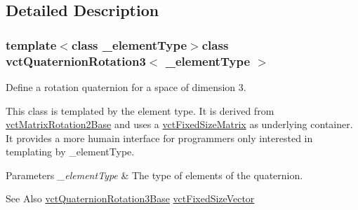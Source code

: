 \subsection{Detailed Description}
\subsubsection*{template$<$class \-\_\-element\-Type$>$class vct\-Quaternion\-Rotation3$<$ \-\_\-element\-Type $>$}

Define a rotation quaternion for a space of dimension 3. 

This class is templated by the element type. It is derived from \hyperlink{classvct_matrix_rotation2_base}{vct\-Matrix\-Rotation2\-Base} and uses a \hyperlink{classvct_fixed_size_matrix}{vct\-Fixed\-Size\-Matrix} as underlying container. It provides a more humain interface for programmers only interested in templating by \-\_\-element\-Type.


\begin{DoxyParams}{Parameters}
{\em \-\_\-element\-Type} & The type of elements of the quaternion.\\
\hline
\end{DoxyParams}
\begin{DoxySeeAlso}{See Also}
\hyperlink{classvct_quaternion_rotation3_base}{vct\-Quaternion\-Rotation3\-Base} \hyperlink{classvct_fixed_size_vector}{vct\-Fixed\-Size\-Vector} 
\end{DoxySeeAlso}


